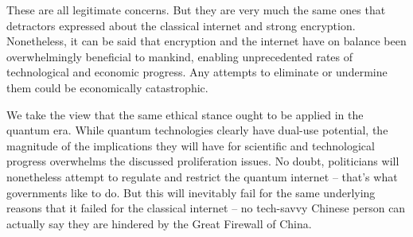 These are all legitimate concerns. But they are very much the same ones that detractors expressed about the classical internet and strong encryption. Nonetheless, it can be said that encryption and the internet have on balance been overwhelmingly beneficial to mankind, enabling unprecedented rates of technological and economic progress. Any attempts to eliminate or undermine them could be economically catastrophic.

We take the view that the same ethical stance ought to be applied in the quantum era. While quantum technologies clearly have dual-use potential, the magnitude of the implications they will have for scientific and technological progress overwhelms the discussed proliferation issues. No doubt, politicians will nonetheless attempt to regulate and restrict the quantum internet -- that's what governments like to do. But this will inevitably fail for the same underlying reasons that it failed for the classical internet -- no tech-savvy Chinese person can actually say they are hindered by the Great Firewall of China\texttrademark.

